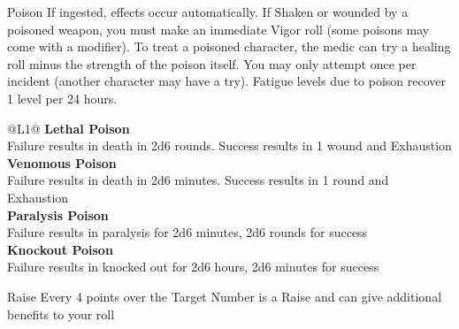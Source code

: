 \begin{genericsection}{Poison}
If ingested, effects occur automatically. If Shaken or wounded by a poisoned weapon, you must make an immediate Vigor roll (some poisons may come with a modifier). To treat a poisoned character, the medic can try a healing roll minus the strength of the poison itself. You may only attempt once per incident (another character may have a try). Fatigue levels due to poison recover 1 level per 24 hours.

\begin{redtable}{\linewidth}{@{}L{1}@{}}
  \textbf{Lethal Poison}\\
  Failure results in death in 2d6 rounds. Success results in 1 wound and Exhaustion\\
  \textbf{Venomous Poison}\\
  Failure results in death in 2d6 minutes. Success results in 1 round and Exhaustion\\
  \textbf{Paralysis Poison}\\
  Failure results in paralysis for 2d6 minutes, 2d6 rounds for success\\
  \textbf{Knockout Poison}\\
  Failure results in knocked out for 2d6 hours, 2d6 minutes for success\ 
\end{redtable}
\end{genericsection}

\begin{genericsection}{Raise}
Every 4 points over the Target Number is a Raise and can give additional benefits to your roll
\end{genericsection}

